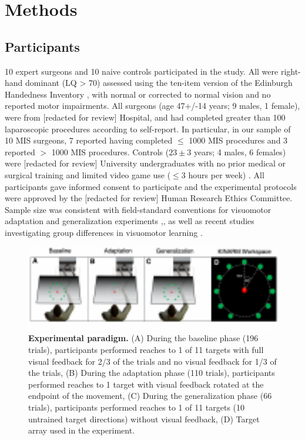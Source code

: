 \documentclass[jou, 11pt, longtable, floatsintext, notab]{apa6}
\begin{document}
\section{Methods}
\subsection{Participants}
10 expert surgeons and 10 naive controls participated in the
study. All were right-hand dominant (LQ > 70) assessed using
the ten-item version of the Edinburgh Handedness Inventory
\cite{oldfield_assessment_1971}, with normal or corrected to
normal vision and no reported motor impairments. All
surgeons (age 47+/-14 years; 9 males, 1 female), were from
[redacted for review] Hospital, and had completed greater
than 100 laparoscopic procedures according to self-report. In
particular, in our sample of 10 MIS surgeons, 7 reported
having completed $\leq$ 1000 MIS procedures and 3 reported $>$ 1000 MIS procedures. Controls ($23\pm3$ years; 4
males, 6 females) were [redacted for review] University
undergraduates with no prior medical or surgical training
and limited video game use ($\leq 3$ hours per week)
\cite{gozli_effect_2014}\cite{lynch_video_2010}\cite{li_playing_2016}.
All participants gave informed consent to participate and
the experimental protocols were approved by the [redacted
for review] Human Research Ethics Committee. Sample size was
consistent with field-standard conventions for visuomotor
adaptation and generalization experiments
\cite{krakauer_learning_2000},\cite{krakauer_independent_1999},\cite{brayanov_motor_2012}
as well as recent studies investigating group differences in
visuomotor learning \cite{leukel_experts_2015}.
\begin{figure}[h!]
  \centering
  \includegraphics[width=1.0\textwidth]{figures/fig_1.pdf}
  \caption{\scriptsize
    \textbf{Experimental paradigm.} (A) During the baseline
    phase (196 trials), participants performed reaches to 1 of
    11 targets with full visual feedback for 2/3 of the trials
    and no visual feedback for 1/3 of the trials, (B) During the
    adaptation phase (110 trials), participants performed
    reaches to 1 target with visual feedback rotated at the
    endpoint of the movement, (C) During the generalization
    phase (66 trials), participants performed reaches to 1 of 11
    targets (10 untrained target directions) without visual
    feedback, (D) Target array used in the experiment.
  }
  \label{fig_paradigm}
\end{figure}
\end{document}
